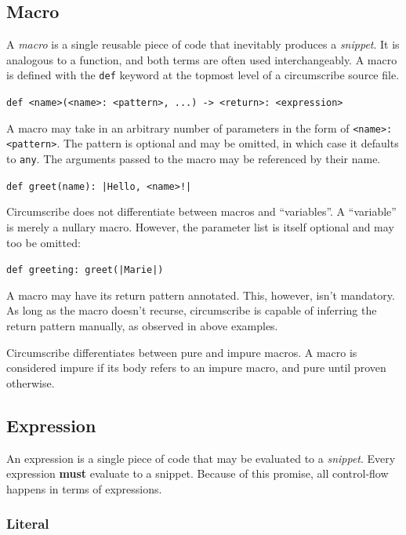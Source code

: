 \documentclass{article}
\begin{document}
\subsection{Macro}

A \emph{macro} is a single reusable piece of code that inevitably produces a \emph{snippet}. It is analogous to a function,
and both terms are often used interchangeably. A macro is defined with the \texttt{def} keyword at the topmost level of
a circumscribe source file.

\begin{center}
    \verb|def <name>(<name>: <pattern>, ...) -> <return>: <expression>|
\end{center}

A macro may take in an arbitrary number of parameters in the form of \verb|<name>: <pattern>|.
The pattern is optional and may be omitted, in which case it defaults to \texttt{any}.
The arguments passed to the macro may be referenced by their name.


\begin{center}
    \verb/def greet(name): |Hello, <name>!|/
\end{center}

Circumscribe does not differentiate between macros and ``variables''.
A ``variable'' is merely a nullary macro. However, the parameter list
is itself optional and may too be omitted:

\begin{center}
    \verb/def greeting: greet(|Marie|)/
\end{center}

A macro may have its return pattern annotated. This, however, isn't mandatory.
As long as the macro doesn't recurse, circumscribe is capable of inferring the
return pattern manually, as observed in above examples.

Circumscribe differentiates between pure and impure macros. A macro is considered
impure if its body refers to an impure macro, and pure until proven otherwise.

\subsection{Expression}

An expression is a single piece of code that may be evaluated to a \emph{snippet}.
Every expression \textbf{must} evaluate to a snippet. Because of this promise, all
control-flow happens in terms of expressions.

\subsubsection{Literal}
\end{document}

